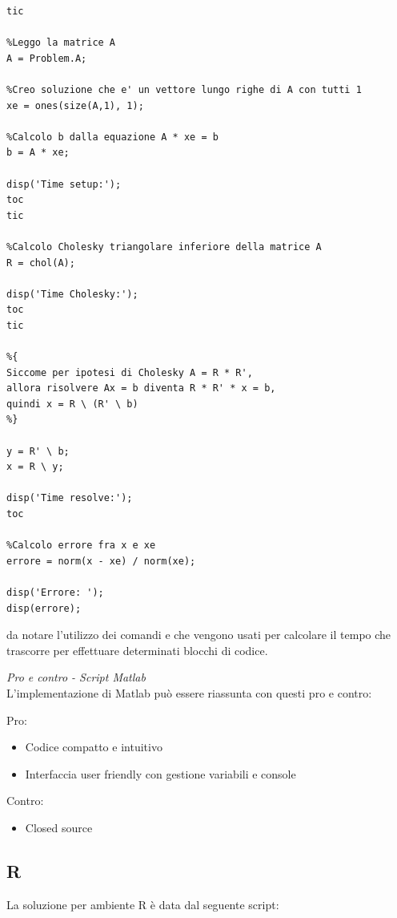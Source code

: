 \documentclass[preprint,12pt]{elsarticle}
\begin{document}
\begin{lstlisting}
tic

%Leggo la matrice A
A = Problem.A;

%Creo soluzione che e' un vettore lungo righe di A con tutti 1
xe = ones(size(A,1), 1);

%Calcolo b dalla equazione A * xe = b
b = A * xe;

disp('Time setup:');
toc
tic

%Calcolo Cholesky triangolare inferiore della matrice A 
R = chol(A);

disp('Time Cholesky:');
toc
tic

%{
Siccome per ipotesi di Cholesky A = R * R',
allora risolvere Ax = b diventa R * R' * x = b,
quindi x = R \ (R' \ b)
%}

y = R' \ b;
x = R \ y;

disp('Time resolve:');
toc

%Calcolo errore fra x e xe
errore = norm(x - xe) / norm(xe);

disp('Errore: ');
disp(errore);

\end{lstlisting}

da notare l'utilizzo dei comandi  e  che vengono usati per calcolare il tempo che trascorre per effettuare determinati blocchi di codice.
\linebreak


\textit{Pro e contro - Script Matlab}\\
\vspace{4mm}
L'implementazione di Matlab può essere riassunta con questi pro e contro:

Pro:
\begin{itemize}
	\item Codice compatto e intuitivo
	\item Interfaccia user friendly con gestione variabili e console
\end{itemize}

Contro:
\begin{itemize}
	\item Closed source
\end{itemize}

\newpage

\subsection{R}

La soluzione per ambiente R è data dal seguente script:
\end{document}
